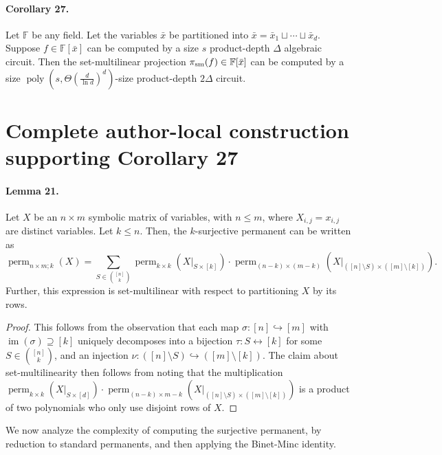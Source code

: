 \documentclass[10pt,a4paper]{article}
\begin{document}
\paragraph{Corollary 27.} Let $\mathbb F$ be any field. Let the variables $\bar x$ be partitioned into $\bar x=\bar x_1\sqcup\cdots\sqcup\bar x_d$. Suppose $f\in\mathbb F[\bar x]$ can be computed by a size $s$ product-depth $\Delta$ algebraic circuit. Then the set-multilinear projection $\pi_{\rm sm}(f)\in\mathbb F[\bar x]$ can be computed by a size $\operatorname{poly}(s,\Theta(\frac d{\ln d})^d)$-size product-depth $2\Delta$ circuit.

\section*{Complete author-local construction supporting Corollary 27}
\paragraph{Lemma 21.} Let $X$ be an $n\times m$ symbolic matrix of variables, with $n\le m$, where $X_{i,j}=x_{i,j}$ are distinct variables. Let $k\le n$. Then, the $k$-surjective permanent can be written as
\[\operatorname{perm}_{n\times m;k}(X)=\sum_{S\in\binom{[n]}k}\operatorname{perm}_{k\times k}(X|_{S\times[k]})\cdot\operatorname{perm}_{(n-k)\times(m-k)}(X|_{([n]\setminus S)\times([m]\setminus[k])}).\]
Further, this expression is set-multilinear with respect to partitioning $X$ by its rows.
\begin{proof}
This follows from the observation that each map $\sigma:[n]\hookrightarrow[m]$ with $\operatorname{im}(\sigma)\supseteq[k]$ uniquely decomposes into a bijection $\tau:S\leftrightarrow[k]$ for some $S\in\binom{[n]}k$, and an injection $\nu:([n]\setminus S)\hookrightarrow([m]\setminus[k])$.
The claim about set-multilinearity then follows from noting that the multiplication $\operatorname{perm}_{k\times k}(X|_{S\times[d]})\cdot\operatorname{perm}_{(n-k)\times m-k}(X|_{([n]\setminus S)\times([m]\setminus[k])})$ is a product of two polynomials who only use disjoint rows of $X$.
\end{proof}
We now analyze the complexity of computing the surjective permanent, by reduction to standard permanents, and then applying the Binet-Minc identity.
\end{document}
